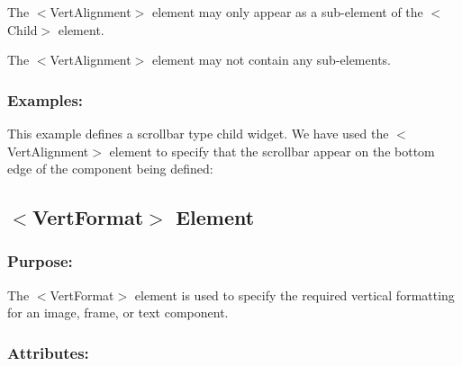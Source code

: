 \begin{DoxyItemize}
\item The {\ttfamily $<$Vert\+Alignment$>$} element may only appear as a sub-\/element of the {\ttfamily $<$Child$>$} element. 
\item The {\ttfamily $<$Vert\+Alignment$>$} element may not contain any sub-\/elements. 
\end{DoxyItemize}\hypertarget{fal_element_ref_fal_elem_ref_sec_35_4}{}\subsubsection{Examples\+:}\label{fal_element_ref_fal_elem_ref_sec_35_4}
This example defines a scrollbar type child widget. We have used the {\ttfamily $<$Vert\+Alignment$>$} element to specify that the scrollbar appear on the bottom edge of the component being defined\+: 
\begin{DoxyCode}{0}
\DoxyCodeLine{\textcolor{stringliteral}{  </Area>}}
\DoxyCodeLine{\textcolor{stringliteral}{</Child>}}
\DoxyCodeLine{\textcolor{stringliteral}{...}}
\end{DoxyCode}
\hypertarget{fal_element_ref_fal_elem_ref_sec_36}{}\subsection{$<$\+Vert\+Format$>$ Element}\label{fal_element_ref_fal_elem_ref_sec_36}
\hypertarget{fal_element_ref_fal_elem_ref_sec_36_1}{}\subsubsection{Purpose\+:}\label{fal_element_ref_fal_elem_ref_sec_36_1}
The {\ttfamily $<$Vert\+Format$>$} element is used to specify the required vertical formatting for an image, frame, or text component.\hypertarget{fal_element_ref_fal_elem_ref_sec_36_2}{}\subsubsection{Attributes\+:}\label{fal_element_ref_fal_elem_ref_sec_36_2}

